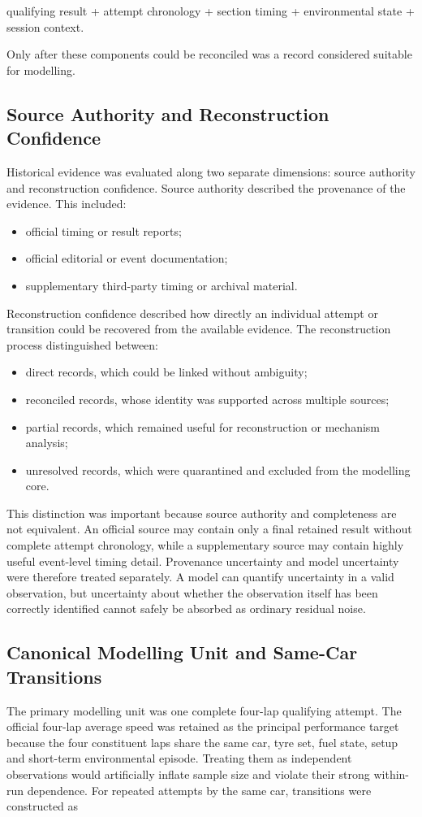 qualifying result + attempt chronology + section timing + environmental state + session context.

Only after these components could be reconciled was a record considered suitable for modelling.

\subsection{Source Authority and Reconstruction Confidence}
Historical evidence was evaluated along two separate dimensions: source authority and reconstruction confidence. Source authority described the provenance of the evidence. This included:

\begin{itemize}
\item official timing or result reports;
\item official editorial or event documentation;
\item supplementary third-party timing or archival material.
\end{itemize}

Reconstruction confidence described how directly an individual attempt or transition could be recovered from the available evidence. The reconstruction process distinguished between:

\begin{itemize}
\item direct records, which could be linked without ambiguity;
\item reconciled records, whose identity was supported across multiple sources;
\item partial records, which remained useful for reconstruction or mechanism analysis;
\item unresolved records, which were quarantined and excluded from the modelling core.
\end{itemize}

This distinction was important because source authority and completeness are not equivalent. An official source may contain only a final retained result without complete attempt chronology, while a supplementary source may contain highly useful event-level timing detail. Provenance uncertainty and model uncertainty were therefore treated separately. A model can quantify uncertainty in a valid observation, but uncertainty about whether the observation itself has been correctly identified cannot safely be absorbed as ordinary residual noise.

\subsection{Canonical Modelling Unit and Same-Car Transitions}
The primary modelling unit was one complete four-lap qualifying attempt. The official four-lap average speed was retained as the principal performance target because the four constituent laps share the same car, tyre set, fuel state, setup and short-term environmental episode. Treating them as independent observations would artificially inflate sample size and violate their strong within-run dependence. For repeated attempts by the same car, transitions were constructed as

